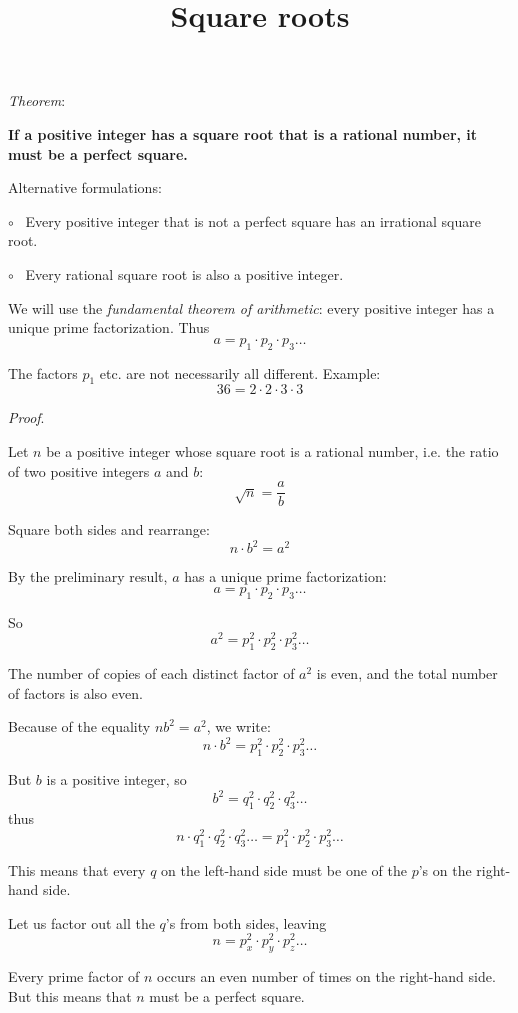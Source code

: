 \documentclass[11pt, oneside]{article}
\title{Square roots}
\date{}
\begin{document}
\maketitle
\Large


\emph{Theorem}:  

\textbf{If a positive integer has a square root that is a rational number, it must be a perfect square.}

Alternative formulations:  

$\circ$ \ Every positive integer that is not a perfect square has an irrational square root.  

$\circ$ \ Every rational square root is also a positive integer.

We will use the \emph{fundamental theorem of arithmetic}:  every positive integer has a unique prime factorization.  Thus
\[ a = p_1 \cdot p_2 \cdot p_3 \dots \]

The factors $p_1$ etc. are not necessarily all different.  Example:
\[ 36 = 2 \cdot 2 \cdot 3 \cdot 3 \]

\emph{Proof}.

Let $n$ be a positive integer whose square root is a rational number, i.e. the ratio of two positive integers $a$ and $b$:
\[ \sqrt{n} = \frac{a}{b} \]

Square both sides and rearrange:
\[ n \cdot b^2 = a^2 \]

By the preliminary result, $a$ has a unique prime factorization:
\[ a = p_1 \cdot p_2 \cdot p_3 \dots \]

So
\[ a^2 = p_1^2 \cdot p_2^2 \cdot p_3^2 \dots \]

The number of copies of each distinct factor of $a^2$ is even, and the total number of factors is also even.  

Because of the equality $nb^2 = a^2$, we write:
\[ n \cdot b^2 =  p_1^2 \cdot p_2^2 \cdot p_3^2 \dots \]

But $b$ is a positive integer, so
\[ b^2 = q_1^2 \cdot q_2^2 \cdot q_3^2 \dots \]
thus
\[ n \cdot q_1^2 \cdot q_2^2 \cdot q_3^2 \dots =  p_1^2 \cdot p_2^2 \cdot p_3^2 \dots \]

This means that every $q$ on the left-hand side must be one of the $p$'s on the right-hand side.

Let us factor out all the $q$'s from both sides, leaving
\[ n =  p_x^2 \cdot p_y^2 \cdot p_z^2 \dots \]

Every prime factor of $n$ occurs an even number of times on the right-hand side.  But this means that $n$ must be a perfect square.  
\end{document}
